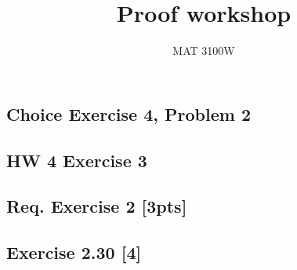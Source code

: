 \documentclass{article}
\title{Proof workshop}
\author{MAT 3100W}
\begin{document}
\maketitle
\newtheorem{proposition}{Proposition}

\pagebreak
\subsection*{Choice Exercise 4, Problem 2}

\pagebreak

\pagebreak

\subsection*{HW 4 Exercise 3}

\pagebreak

\pagebreak

\subsection*{Req. Exercise 2 [3pts]}

\pagebreak

\pagebreak

\subsection{Exercise 2.30 [4]}

\pagebreak

\pagebreak
\end{document}
